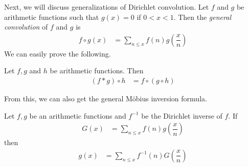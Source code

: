 \documentclass[elemannt.tex]{subfile}
\begin{document}
    Next, we will discuss generalizations of Dirichlet convolution. Let $f$ and $g$ be arithmetic functions such that $g(x)=0$ if $0<x<1$. Then the \textit{general convolution} of $f$ and $g$ is
    	\begin{align*}
    		f\circ g(x)
    			& = \sum\limits_{n\leq x}f(n)g\left(\dfrac{x}{n}\right)
    	\end{align*}
    We can easily prove the following.
    	\begin{theorem}\label{thm:genconv}
    		Let $f,g$ and $h$ be arithmetic functions. Then
    			\begin{align*}
    				(f\ast g)\circ h
    					& = f\circ(g\circ h)
    			\end{align*}
    	\end{theorem}
    From this, we can also get the general M\"{o}bius inversion formula.
    	\begin{theorem}
    		Let $f,g$ be an arithmetic functions and $f^{-1}$ be the Dirichlet inverse of $f$. If
    			\begin{align*}
    				G(x)
    					& = \sum\limits_{n\leq x}f(n)g\left(\dfrac{x}{n}\right)
    			\end{align*}
    		then
    			\begin{align*}
    				g(x)
    					& = \sum\limits_{n\leq x}f^{-1}(n)G\left(\dfrac{x}{n}\right)
    			\end{align*}
    	\end{theorem}
\end{document}
